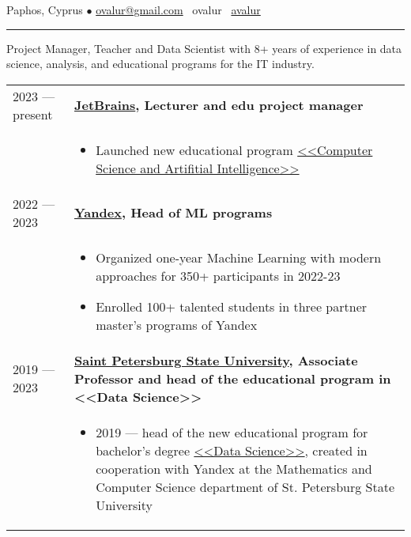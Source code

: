 \documentclass[11pt]{article}
\begin{document}
%

\vspace{0.5em}

\noindent Paphos, Cyprus $\bullet$ \href{mailto:ovalur@gmail.com}{ovalur@gmail.com} \faSendO~ovalur
\faGithub~\href{https://github.com/avalur}{avalur}

\vspace{0.5em}
\hrule
\vspace{0.5em}

Project Manager, Teacher and Data Scientist with 8+ years of experience in data science, analysis, and educational programs for the IT industry.

\vspace{0.5em}
\begin{longtable} {l | p{}}
2023 — present & {\textbf{\href{https://jetbrains.com}{JetBrains}, Lecturer and edu project manager}} \\
& \vspace{-1.5em} 
	\begin{itemize}
		\item Launched new educational program \href{https://blog.jetbrains.com/education/2023/05/03/introducing-the-computer-science-and-artificial-intelligence-bachelor-s-program-with-neapolis-university-paphos/}{<<Computer Science and Artifitial Intelligence>>}
	\end{itemize} \\
2022 — 2023 & {\textbf{\href{https://ya.ru/}{Yandex}, Head of ML programs}} \\
& \vspace{-1.5em}
	\begin{itemize}
		\item Organized one-year Machine Learning with modern approaches for 350+ participants in 2022-23
		\item Enrolled 100+ talented students in three partner master's programs of Yandex
	\end{itemize} \\
2019 — 2023 & {\textbf{\href{https://english.spbu.ru/}{Saint Petersburg State University}, Associate Professor and head of the educational program in <<Data Science>>}} \\
& \vspace{-1.5em}
\begin{itemize}
\item 2019 — head of the new educational program for bachelor's degree \href{https://maad.compscicenter.ru}{<<Data Science>>}, created in cooperation with Yandex at the Mathematics and Computer Science department of St. Petersburg State University


\end{itemize}
\end{longtable}
\end{document}
